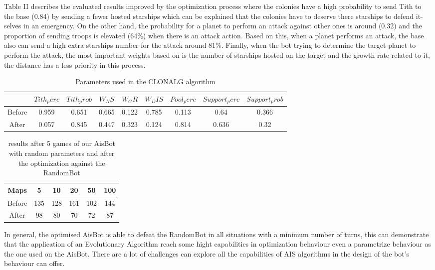 \documentclass[conference]{IEEEtran}
\begin{document}
Table II describes the evaluated results improved by the optimization process where the colonies have a high probability to send Tith to the base (0.84) by sending a fewer hosted starships which can be explained that the colonies have to deserve there starships to defend it-selves in an emergency. On the other hand, the probability for a planet to perform an attack against other ones is around (0.32) and the proportion of sending troops is elevated (64\%) when there is an attack action. Based on this, when a planet performs an attack, the base also can send a high extra starships number for the attack around 81\%. Finally, when the bot trying to determine the target planet to perform the attack, the most important weights based on is the number of starships hosted on the target and the growth rate related to it, the distance has a less priority in this process. \\

\begin{table}
\centering
\begin{tabular}{|c|c|c|c|c|c|c|c|c|}
\hline
 & $Tith_perc$ & $Tith_prob$ & $W_NS$ & $W_GR$ & $W_DIS$ & $Pool_perc$ & $Support_perc$ & $Support_prob$ \\ 
 \hline
 Before & 0.959 & 0.651 & 0.665 & 0.122 & 0.785 & 0.113 & 0.64 & 0.366 \\  
 \hline
 After & 0.057 & 0.845 & 0.447 & 0.323 & 0.124 & 0.814 & 0.636 & 0.32 \\
 \hline  
\end{tabular}
\caption{Parameters used in the CLONALG algorithm}
\label{TABLE 2}
\end{table}

\begin{table}
\centering
\begin{tabular}{|c|c|c|c|c|c|}
\hline
 Maps & 5 & 10 & 20 & 50 & 100 \\ 
 \hline
 Before & 135 & 128 & 161 & 102 & 144 \\  
 \hline
 After & 98 & 80 & 70 & 72 & 87 \\
 \hline  
\end{tabular}
\caption{results after 5 games of our AisBot with random parameters and after the optimization against the RandomBot}
\label{TABLE 3}
\end{table}

In general, the optimised AisBot is able to defeat the RandomBot in all situations with a minimum number of turns, this can demonstrate that the application of an Evolutionary Algorithm reach some hight capabilities in optimization behaviour even a parametrize behaviour as the one used on the AisBot. There are a lot of challenges can explore all the capabilities of AIS algorithms in the design of the bot's behaviour can offer.
\end{document}
